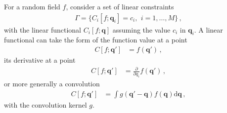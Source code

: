 \documentclass[a4paper, 11pt]{article}
\begin{document}
For a random field $f$, consider a set of linear constraints
\begin{align}
\Gamma =\{ C_i[f;\bm{q}_i] = c_i,\,\ i=1,\dots,M \}\,,
\end{align}
with the linear functional $C_i[f;\bm{q}]$ assuming the value $c_i$ in $\bm{q}_i$. A linear functional can take the form of the function value at a point
\begin{align}
C[f;\bm{q}'] &= f(\bm{q}')\,,
\end{align}
its derivative at a point
\begin{align}
C[f;\bm{q}'] &= \frac{\partial}{\partial q_i}f(\bm{q}')\,,
\end{align}
or more generally a convolution
\begin{align}
C[f;\bm{q}'] &= \int g(\bm{q}' - \bm{q})f(\bm{q})\mathrm{d}\bm{q}\,,
\end{align}
with the convolution kernel $g$. 
\end{document}
